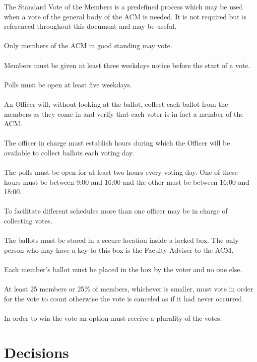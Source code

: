 \documentclass[12pt,titlepage]{article}
\begin{document}
The Standard Vote of the Members is a predefined process which may be used when a vote of the general body of the ACM is needed. It is not required but is referenced throughout this document and may be useful.\\
\\
Only members of the ACM in good standing may vote.\\
\\
Members must be given at least three weekdays notice before the start of a vote.\\
\\
Polls must be open at least five weekdays.\\
\\
An Officer will, without looking at the ballot, collect each ballot from the members as they come in and verify that each voter is in fact a member of the ACM.\\
\\
The officer in charge must establish hours during which the Officer will be available to collect ballots each voting day.\\
\\
The polls must be open for at least two hours every voting day. One of these hours must be between 9:00 and 16:00 and the other must be between 16:00 and 18:00.\\
\\
To facilitate different schedules more than one officer may be in charge of collecting votes.\\
\\
The ballots must be stored in a secure location inside a locked box. The only person who may have a key to this box is the Faculty Adviser to the ACM.\\
\\
Each member's ballot must be placed in the box by the voter and no one else.\\
\\
At least 25 members or 25\% of members, whichever is smaller, must vote in order for the vote to count otherwise the vote is canceled as if it had never occurred.\\
\\
In order to win the vote an option must receive a plurality of the votes.

\section{Decisions}
\end{document}
